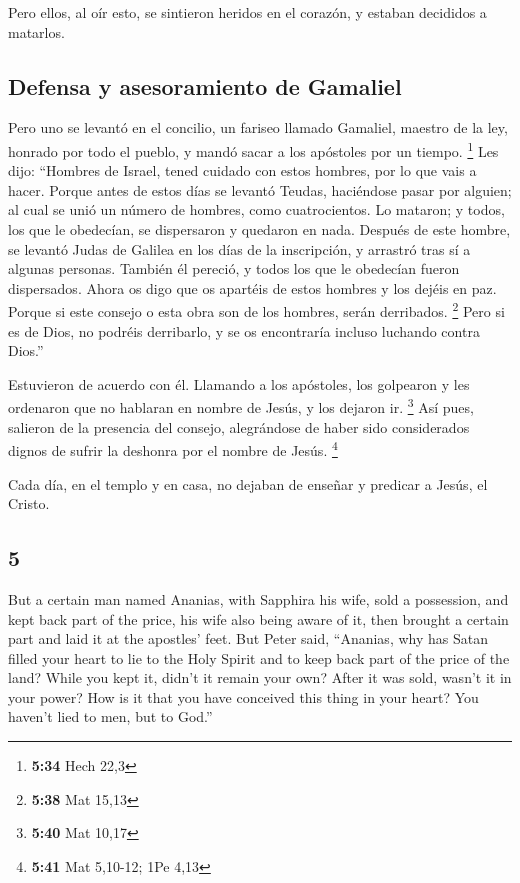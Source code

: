 \begin{paracol}{2}
 Pero ellos, al oír esto, se sintieron heridos en el
corazón, y estaban decididos a matarlos.

\hypertarget{defensa-y-asesoramiento-de-gamaliel}{%
\subsection{Defensa y asesoramiento de
Gamaliel}\label{defensa-y-asesoramiento-de-gamaliel}}

 Pero uno se levantó en el concilio, un fariseo llamado
Gamaliel, maestro de la ley, honrado por todo el pueblo, y mandó sacar a
los apóstoles por un tiempo. \footnote{\textbf{5:34} Hech 22,3}
 Les dijo: ``Hombres de Israel, tened cuidado con estos
hombres, por lo que vais a hacer.  Porque antes de estos
días se levantó Teudas, haciéndose pasar por alguien; al cual se unió un
número de hombres, como cuatrocientos. Lo mataron; y todos, los que le
obedecían, se dispersaron y quedaron en nada.  Después de
este hombre, se levantó Judas de Galilea en los días de la inscripción,
y arrastró tras sí a algunas personas. También él pereció, y todos los
que le obedecían fueron dispersados.  Ahora os digo que
os apartéis de estos hombres y los dejéis en paz. Porque si este consejo
o esta obra son de los hombres, serán derribados. \footnote{\textbf{5:38}
  Mat 15,13}  Pero si es de Dios, no podréis derribarlo,
y se os encontraría incluso luchando contra Dios.''

 Estuvieron de acuerdo con él. Llamando a los apóstoles,
los golpearon y les ordenaron que no hablaran en nombre de Jesús, y los
dejaron ir. \footnote{\textbf{5:40} Mat 10,17}  Así pues,
salieron de la presencia del consejo, alegrándose de haber sido
considerados dignos de sufrir la deshonra por el nombre de Jesús.
\footnote{\textbf{5:41} Mat 5,10-12; 1Pe 4,13}

 Cada día, en el templo y en casa, no dejaban de enseñar
y predicar a Jesús, el Cristo.

\switchcolumn
\begin{otherlanguage}{english}

\hypertarget{section-9}{%
\section{5}\label{section-9}}

 But a certain man named Ananias, with Sapphira his wife,
sold a possession,  and kept back part of the price, his
wife also being aware of it, then brought a certain part and laid it at
the apostles' feet.  But Peter said, ``Ananias, why has
Satan filled your heart to lie to the Holy Spirit and to keep back part
of the price of the land?  While you kept it, didn't it
remain your own? After it was sold, wasn't it in your power? How is it
that you have conceived this thing in your heart? You haven't lied to
men, but to God.''


\end{otherlanguage}
\end{paracol}

